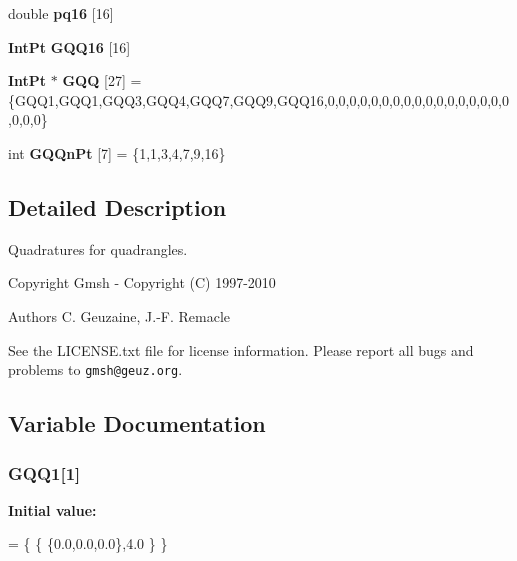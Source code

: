 \begin{DoxyCompactItemize}
\item 
double {\bfseries pq16} [16]
\item 
{\bf Int\-Pt} {\bfseries G\-Q\-Q16} [16]
\item 
{\bf Int\-Pt} $\ast$ {\bfseries G\-Q\-Q} [27] = \{G\-Q\-Q1,G\-Q\-Q1,G\-Q\-Q3,G\-Q\-Q4,G\-Q\-Q7,G\-Q\-Q9,G\-Q\-Q16,0,0,0,0,0,0,0,0,0,0,0,0,0,0,0,0,0,0,0,0\}\label{GaussQuadratureQuad_8cc_a196c2b621de3178305f27607eb19eacd}

\item 
int {\bfseries G\-Q\-Qn\-Pt} [7] = \{1,1,3,4,7,9,16\}\label{GaussQuadratureQuad_8cc_a32c5be2fce33c0274ef5e9999a796160}

\end{DoxyCompactItemize}


\subsection{Detailed Description}
Quadratures for quadrangles. \begin{DoxyCopyright}{Copyright}
Gmsh -\/ Copyright (C) 1997-\/2010 
\end{DoxyCopyright}
\begin{DoxyAuthor}{Authors}
C. Geuzaine, J.-\/\-F. Remacle
\end{DoxyAuthor}
See the L\-I\-C\-E\-N\-S\-E.\-txt file for license information. Please report all bugs and problems to {\tt gmsh@geuz.\-org}. 

\subsection{Variable Documentation}
\subsubsection[{G\-Q\-Q1}]{ G\-Q\-Q1[1]}\label{GaussQuadratureQuad_8cc_a88e6c88776d0df4ee7914dbc65f70125}
{\bfseries Initial value\-:}
\begin{DoxyCode}
= \{
  \{ \{0.0,0.0,0.0\},4.0 \}
\}
\end{DoxyCode}
